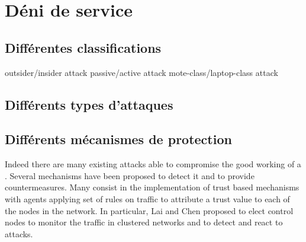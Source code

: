 \section{Déni de service}

\subsection{Différentes classifications}

outsider/insider attack
passive/active attack
mote-class/laptop-class attack

\subsection{Différents types d'attaques}

\subsection{Différents mécanismes de protection}

Indeed there are many existing attacks able to compromise the good working of a \wsn.%
Several mechanisms have been proposed to detect it and to provide countermeasures\cite{SSS11}. %
Many consist in the implementation of trust based mechanisms\cite{MC10,F-GRL07} with agents applying set of rules\cite{RKKK13} on traffic to attribute a trust value to each of the nodes in the network.
In particular, Lai and Chen\cite{LC08} proposed to elect control nodes to monitor the traffic in clustered networks and to detect and react to \dos attacks.






